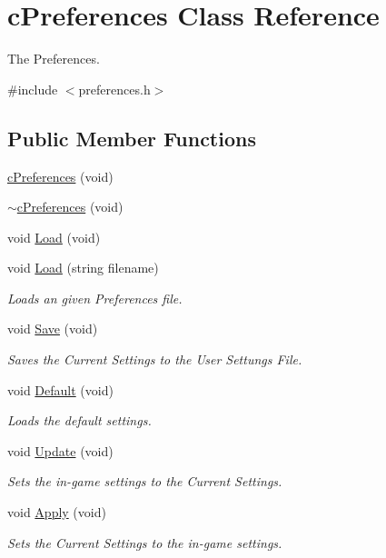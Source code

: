 \hypertarget{classc_preferences}{\section{c\-Preferences Class Reference}
\label{classc_preferences}
}


The Preferences.  




{\ttfamily \#include $<$preferences.\-h$>$}

\subsection*{Public Member Functions}
\begin{DoxyCompactItemize}
\item 
\hyperlink{classc_preferences_a48823f0c8ccb1813afa19491a5774091}{c\-Preferences} (void)
\item 
\hyperlink{classc_preferences_a56714b3e250783fe6ae7d0d30c0c6114}{$\sim$c\-Preferences} (void)
\item 
void \hyperlink{classc_preferences_abd5bdb8036b92286a8cbf32a6b16a3a0}{Load} (void)
\item 
void \hyperlink{classc_preferences_aeb14f132e6c84ef7db2b65769773ed14}{Load} (string filename)
\begin{DoxyCompactList}\small\item\em Loads an given Preferences file. \end{DoxyCompactList}\item 
void \hyperlink{classc_preferences_a5cefc473eff147de29e5d45b3251e372}{Save} (void)
\begin{DoxyCompactList}\small\item\em Saves the Current Settings to the User Settungs File. \end{DoxyCompactList}\item 
void \hyperlink{classc_preferences_a5a467f4dc7d4a3c6b0570961ef032ea4}{Default} (void)
\begin{DoxyCompactList}\small\item\em Loads the default settings. \end{DoxyCompactList}\item 
void \hyperlink{classc_preferences_adb37aa16cf6cc320a5f13ba7296b6448}{Update} (void)
\begin{DoxyCompactList}\small\item\em Sets the in-\/game settings to the Current Settings. \end{DoxyCompactList}\item 
void \hyperlink{classc_preferences_a82383f70bf9e5667335affbd51abc0f2}{Apply} (void)
\begin{DoxyCompactList}\small\item\em Sets the Current Settings to the in-\/game settings. \end{DoxyCompactList}\end{DoxyCompactItemize}
